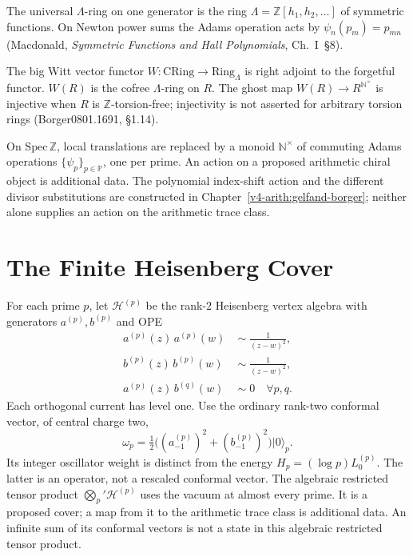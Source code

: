 \begin{remark}
The universal \(\Lambda\)-ring on one generator is the ring
\(\Lambda=\mathbb{Z}[h_{1},h_{2},\ldots]\) of symmetric functions. On
Newton power sums the Adams operation acts by
\(\psi_{n}(p_{m})=p_{mn}\) (Macdonald, \emph{Symmetric Functions and
Hall Polynomials}, Ch.~I~\S8).
\end{remark}

\begin{remark}
The big Witt vector functor \(W\colon\mathrm{CRing}\to\mathrm{Ring}_{\Lambda}\)
is right adjoint to the forgetful functor. \(W(R)\) is the cofree
\(\Lambda\)-ring on \(R\). The ghost map \(W(R)\to R^{\mathbb{N}^{\times}}\) is injective
when \(R\) is \(\mathbb Z\)-torsion-free; injectivity is not asserted
for arbitrary torsion rings (Borger0801.1691, \S1.14).
\end{remark}

On \(\mathrm{Spec}\,\mathbb{Z}\), local translations are replaced by a
monoid \(\mathbb{N}^{\times}\) of commuting Adams operations \(\{\psi_p\}_{p\in\mathbb{P}}\),
one per prime. An action on a proposed arithmetic chiral object is additional data.
The polynomial index-shift action and the different divisor substitutions
are constructed in Chapter~\ref{v4-arith:gelfand-borger}; neither alone
supplies an action on the arithmetic trace class.

\section{The Finite Heisenberg Cover}
\label{v4-arith:construction:primon-va}

\begin{definition}
\label{v4-arith:def:primon-va-naive}
For each prime \(p\), let \(\mathcal{H}^{(p)}\) be the rank-\(2\)
Heisenberg vertex algebra with generators \(a^{(p)},b^{(p)}\) and OPE
\begin{align}
a^{(p)}(z)\,a^{(p)}(w)\;&\sim\;\frac{1}{(z-w)^{2}}, \\
b^{(p)}(z)\,b^{(p)}(w)\;&\sim\;\frac{1}{(z-w)^{2}}, \\
a^{(p)}(z)\,b^{(q)}(w)\;&\sim\;0\quad\forall p,q.
\end{align}
Each orthogonal current has level one. Use the ordinary rank-two
conformal vector, of central charge two,
\[
 \omega_p=\tfrac12\bigl((a^{(p)}_{-1})^2+(b^{(p)}_{-1})^2\bigr)|0\rangle_p.
\]
Its integer oscillator weight is distinct from the energy
\(H_p=(\log p)L_0^{(p)}\). The latter is an operator, not a rescaled
conformal vector. The algebraic restricted tensor product
\(\bigotimes_p'\mathcal H^{(p)}\) uses the vacuum at almost every prime.
It is a proposed cover; a map from it to the arithmetic trace class
is additional data. An infinite sum of its conformal vectors is not a
state in this algebraic restricted tensor product.
\end{definition}


